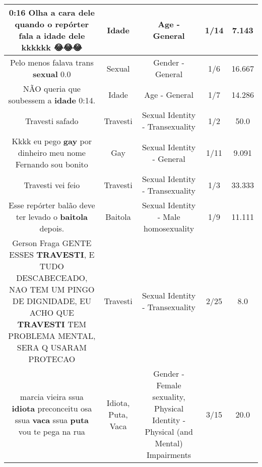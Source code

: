 \documentclass[11pt]{article}
\newlength\mylength
\begin{document}
\begin{center}
\begin{longtable}{|C{.65\mylength}|C{.30\mylength}|C{.12\mylength}|C{.12\mylength}|C{.12\mylength}|}
  \small 0:16 Olha a cara dele quando o repórter fala a \textbf{idade} dele kkkkkk 😂😂😂\normalsize   & Idade & Age - General & 1/14 & 7.143 \\  \hline
  \small Pelo menos falava trans \textbf{sexual} 0.0\normalsize   & Sexual & Gender - General & 1/6 & 16.667 \\  \hline
  \small NÃO queria que soubessem a \textbf{idade} 0:14.\normalsize   & Idade & Age - General & 1/7 & 14.286 \\  \hline
  \small Travesti safado\normalsize   & Travesti & Sexual Identity - Transexuality & 1/2 & 50.0 \\  \hline
  \small Kkkk eu pego \textbf{gay} por dinheiro meu nome Fernando sou bonito\normalsize   & Gay & Sexual Identity - General & 1/11 & 9.091 \\  \hline
  \small Travesti vei feio\normalsize   & Travesti & Sexual Identity - Transexuality & 1/3 & 33.333 \\  \hline
  \small Esse repórter balão deve ter levado o \textbf{baitola} depois.\normalsize   & Baitola & Sexual Identity - Male homosexuality & 1/9 & 11.111 \\  \hline
  \small Gerson Fraga GENTE ESSES \textbf{TRAVESTI}, E TUDO DESCABECEADO, NAO TEM UM PINGO DE DIGNIDADE, EU ACHO QUE \textbf{TRAVESTI} TEM PROBLEMA MENTAL, SERA Q USARAM PROTECAO\normalsize   & Travesti & Sexual Identity - Transexuality & 2/25 & 8.0 \\  \hline
  \small marcia vieira ssua    \textbf{idiota} preconceitu    osa    ssua    \textbf{vaca}    ssua   \textbf{puta}    vou te    pega    na    rua\normalsize   & Idiota, Puta, Vaca & Gender - Female sexuality, Physical Identity - Physical (and Mental) Impairments & 3/15 & 20.0 \\  \hline

\end{longtable}
\end{center}
\end{document}
